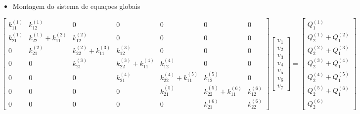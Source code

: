 \documentclass{article} %
\begin{document}
\begin{itemize}
	\item Montagem do sistema de equaçoes globais
\end{itemize}
\begin{equation*}
\begin{bmatrix}
k_{11} ^{(1)}& k_{12} ^{(1)} & 0& 0& 0& 0& 0\\
k_{21} ^{(1)}& k_{22} ^{(1)}+k_{11} ^{(2)} & k_{12} ^{(2)}& 0& 0& 0& 0\\
0&k_{21} ^{(2)}& k_{22} ^{(2)} +k_{11} ^{(3)}& k_{12} ^{(3)}& 0& 0& 0\\
0&0&k_{21} ^{(3)}& k_{22} ^{(3)} +k_{11} ^{(4)}& k_{12} ^{(4)}& 0& 0\\
0&0&0&k_{21} ^{(4)}& k_{22} ^{(4)} +k_{11} ^{(5)}& k_{12} ^{(5)}& 0\\
0&0&0&0&k_{21} ^{(5)}& k_{22} ^{(5)}+k_{11} ^{(6)} & k_{12} ^{(6)}\\
0&0&0&0&0& k_{21} ^{(6)} & k_{22} ^{(6)}
\end{bmatrix}\begin{bmatrix}
v_1\\
v_2\\
v_3\\
v_4\\
v_5\\
v_6\\
v_7
\end{bmatrix}=\begin{bmatrix}
Q_1^{(1)}\\
Q_2^{(1)}+Q_1^{(2)}\\
Q_2^{(2)}+Q_1^{(3)}\\
Q_2^{(3)}+Q_1^{(4)}\\
Q_2^{(4)}+Q_1^{(5)}\\
Q_2^{(5)}+Q_1^{(6)}\\
Q_2^{(6)}
\end{bmatrix}
\end{equation*}
\end{document}
